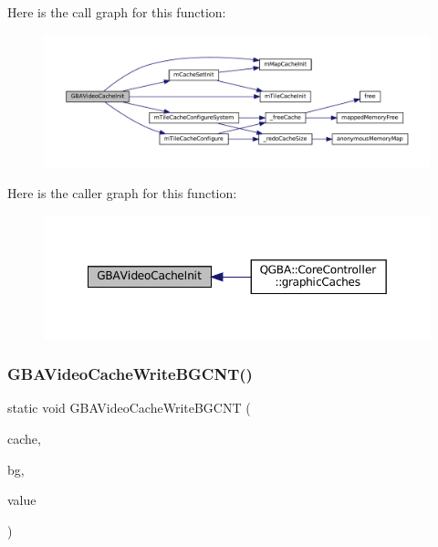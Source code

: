 Here is the call graph for this function\+:
\nopagebreak
\begin{figure}[H]
\begin{center}
\leavevmode
\includegraphics[width=350pt]{gba_2renderers_2cache-set_8c_a19731671a169a93b76c08671ee5ae0d9_cgraph}
\end{center}
\end{figure}
Here is the caller graph for this function\+:
\nopagebreak
\begin{figure}[H]
\begin{center}
\leavevmode
\includegraphics[width=349pt]{gba_2renderers_2cache-set_8c_a19731671a169a93b76c08671ee5ae0d9_icgraph}
\end{center}
\end{figure}
\mbox{\label{gba_2renderers_2cache-set_8c_a1299d4a8657975bf62ba1d6e26410a7d}} 
\subsubsection{\texorpdfstring{G\+B\+A\+Video\+Cache\+Write\+B\+G\+C\+N\+T()}{GBAVideoCacheWriteBGCNT()}}
{\footnotesize\ttfamily static void G\+B\+A\+Video\+Cache\+Write\+B\+G\+C\+NT (\begin{DoxyParamCaption}\item[{struct m\+Cache\+Set $\ast$}]{cache,  }\item[{size\+\_\+t}]{bg,  }\item[{uint16\+\_\+t}]{value }\end{DoxyParamCaption})\hspace{0.3cm}{\ttfamily [static]}}

